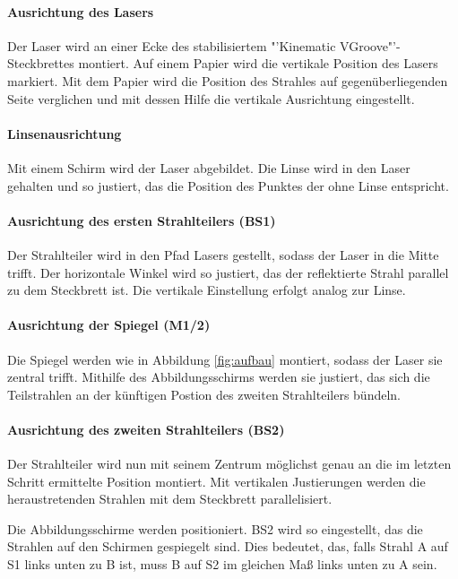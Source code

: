 \documentclass[a4paper,ngerman]{scrartcl}
\begin{document}
\paragraph{Ausrichtung des Lasers}
Der Laser wird an einer Ecke des stabilisiertem "'Kinematic VGroove"'-Steckbrettes montiert. 
Auf einem Papier wird die vertikale Position des Lasers markiert. 
Mit dem Papier wird die Position des Strahles auf gegenüberliegenden Seite verglichen und mit dessen Hilfe die vertikale Ausrichtung eingestellt.  

\paragraph{Linsenausrichtung}
Mit einem Schirm wird der Laser abgebildet. Die Linse wird in den Laser gehalten und so justiert, das die Position des Punktes der ohne Linse entspricht.

\paragraph{Ausrichtung des ersten Strahlteilers (BS1)}
Der Strahlteiler wird in den Pfad Lasers gestellt, sodass der Laser in die Mitte trifft. 
Der horizontale Winkel wird so justiert, das der reflektierte Strahl parallel zu dem Steckbrett ist. 
Die vertikale Einstellung erfolgt analog zur Linse.

\paragraph{Ausrichtung der Spiegel (M1/2)}
Die Spiegel werden wie in Abbildung \ref{fig:aufbau} montiert, sodass der Laser sie zentral trifft. 
Mithilfe des Abbildungsschirms werden sie justiert, das sich die Teilstrahlen an der künftigen Postion des zweiten Strahlteilers bündeln. 

\paragraph{Ausrichtung des zweiten Strahlteilers (BS2)}
Der Strahlteiler wird nun mit seinem Zentrum möglichst genau an die im letzten Schritt ermittelte Position montiert. Mit vertikalen Justierungen werden die heraustretenden Strahlen mit dem Steckbrett parallelisiert.

Die Abbildungsschirme werden positioniert. BS2 wird so eingestellt, das die Strahlen auf den Schirmen gespiegelt sind. Dies bedeutet, das, falls Strahl A auf S1 links unten zu B ist, muss B auf S2 im gleichen Maß links unten zu A sein.
\end{document}

